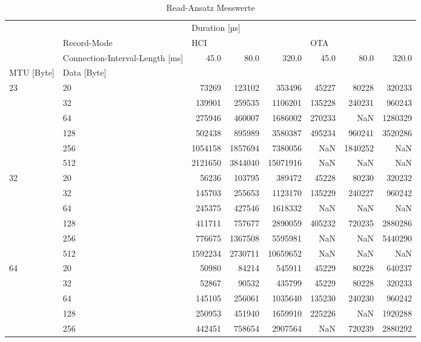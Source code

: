 \begin{table}
\centering
\caption{Read-Ansatz Messwerte}
\label{table:generalreadrecords}
\begin{tabular}{llrrrrrr}
\toprule
    & {} & \multicolumn{6}{l}{Duration [µs]} \\
    & Record-Mode & \multicolumn{3}{l}{HCI} & \multicolumn{3}{l}{OTA} \\
    & Connection-Interval-Length [ms] &    45.0  &   80.0  &    320.0 &  45.0  &   80.0  &   320.0 \\
MTU [Byte] & Data [Byte] &          &         &          &        &         &         \\
\midrule
\multirow{6}{*}{23} & 20  &    73269 &  123102 &   353496 &  45227 &   80228 &  320233 \\
    & 32  &   139901 &  259535 &  1106201 & 135228 &  240231 &  960243 \\
    & 64  &   275946 &  460007 &  1686002 & 270233 &     NaN & 1280329 \\
    & 128 &   502438 &  895989 &  3580387 & 495234 &  960241 & 3520286 \\
    & 256 &  1054158 & 1857694 &  7380056 &    NaN & 1840252 &     NaN \\
    & 512 &  2121650 & 3844040 & 15071916 &    NaN &     NaN &     NaN \\
\cline{1-8}
\multirow{6}{*}{32} & 20  &    56236 &  103795 &   389472 &  45228 &   80230 &  320232 \\
    & 32  &   145703 &  255653 &  1123170 & 135229 &  240227 &  960242 \\
    & 64  &   245375 &  427546 &  1618332 &    NaN &     NaN &     NaN \\
    & 128 &   411711 &  757677 &  2890059 & 405232 &  720235 & 2880286 \\
    & 256 &   776675 & 1367508 &  5595981 &    NaN &     NaN & 5440290 \\
    & 512 &  1592234 & 2730711 & 10659652 &    NaN &     NaN &     NaN \\
\cline{1-8}
\multirow{6}{*}{64} & 20  &    50980 &   84214 &   545911 &  45229 &   80228 &  640237 \\
    & 32  &    52867 &   90532 &   435799 &  45229 &   80228 &  320233 \\
    & 64  &   145105 &  256061 &  1035640 & 135230 &  240230 &  960242 \\
    & 128 &   250953 &  451940 &  1659910 & 225226 &     NaN & 1920288 \\
    & 256 &   442451 &  758654 &  2907564 &    NaN &  720239 & 2880292 \\

\end{tabular}
\end{table}
